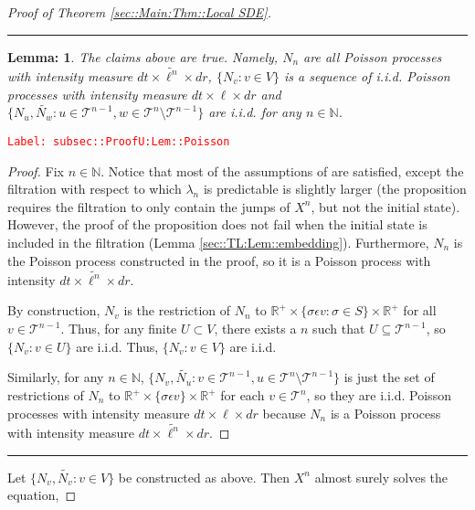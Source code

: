 \documentclass[12pt]{article}
\newcommand{\mb}{\mathbb}
\newcommand{\mc}{\mathcal}
\newcommand{\ep}{\epsilon}
\newcommand{\tr}{\textcolor{red}}
\newcommand{\labe}[1]{\tr{\texttt{Label: #1}}}
\newcommand{\ind}{\hspace{24pt}}
\newcommand{\lin}{\rule{\linewidth}{0.4 pt}}
\renewcommand{\v}{v}							%
\newcommand{\vv}{u}								%
\newcommand{\vvv}{w}							%
\renewcommand{\U}{U}							%
\renewcommand{\S}{S}							%
\newcommand{\s}{\sigma}							%
\newcommand{\ev}{\ep}							%
\renewcommand{\t}{t}							%
\newcommand{\poiss}[1]{N_{#1}}						%
\newcommand{\pup}[1]{^{#1}}							%
\newcommand{\tree}{\mc{T}}							%
\newcommand{\V}{V}									%
\renewcommand{\r}{r}								%
\newcommand{\numb}{n}								%
\newcommand{\rxvtsn}[3]{X_{#1}^{#3}{#2}}			%
\newcommand{\rate}[1]{\lambda_{#1}}					%
\newcommand{\Sm}{\ell}								%
\newcommand{\alt}{\widetilde}						%
\newtheorem{lem}[thms]{Lemma: }
\begin{document}
\begin{proof}[Proof of Theorem \ref{sec::Main:Thm::Local SDE}]
\lin

\begin{lem}
The claims above are true. Namely, \(\poiss{\numb}\) are all Poisson processes with intensity measure \(d\t\times\alt{\Sm^{\numb}}\times d\r\), \(\{\poiss{\v}:\v\in\V\}\) is a sequence of i.i.d. Poisson processes with intensity measure \(d\t\times\Sm\times d\r\) and \(\{\poiss{\vv},\alt{\poiss{\vvv}}:\vv\in \tree\pup{\numb-1},\vvv\in\tree\pup{\numb}\setminus\tree\pup{\numb-1}\}\) are i.i.d. for any \(\numb \in \mb{N}\).

\label{subsec::ProofU:Lem::Poisson}
\end{lem}
\labe{subsec::ProofU:Lem::Poisson}
\begin{proof}

Fix \(\numb \in \mb{N}\). Notice that most of the assumptions of \cite[Proposition 14.7.I(b)]{DalVer08} are satisfied, except the filtration with respect to which \(\rate{\numb}\) is predictable is slightly larger (the proposition requires the filtration to only contain the jumps of \(\rxvtsn{}{}{\numb}\), but not the initial state). However, the proof of the proposition does not fail when the initial state is included in the filtration (Lemma \ref{sec::TL:Lem::embedding}). Furthermore, \(\poiss{\numb}\) is the Poisson process constructed in the proof, so it is a Poisson process with intensity \(d\t\times \alt{\Sm^\numb}\times d\r\).

\ind By construction, \(\poiss{\v}\) is the restriction of \(\poiss{\numb}\) to \(\mb{R}^+ \times \{\s\ev{\v}: \s\in \S\}\times \mb{R}^+\) for all \(\v\in \tree\pup{\numb-1}\). Thus, for any finite \(\U \subset \V\), there exists a \(\numb\) such that \(\U \subseteq \tree\pup{\numb-1}\), so \(\{\poiss{\v}: \v\in \U\}\) are i.i.d. Thus, \(\{\poiss{\v}: \v\in \V\}\) are i.i.d.

\ind Similarly, for any \(\numb \in \mb{N}\), \(\{\poiss{\v},\alt{\poiss{\vv}}: \v \in \tree\pup{\numb-1},\vv\in\tree\pup{\numb}\setminus\tree\pup{\numb-1}\}\) is just the set of restrictions of \(\poiss{\numb}\) to \(\mb{R}^+\times\{\s\ev{\v}\}\times\mb{R}^+\) for each \(\v\in \tree\pup{\numb}\), so they are i.i.d. Poisson processes with intensity measure \(d\t\times \Sm\times d\r\) because \(\poiss{\numb}\) is a Poisson process with intensity measure \(d\t\times\alt{\Sm^\numb}\times d\r\).
\end{proof}
\lin

Let \(\{\poiss{\v},\alt{\poiss{\v}}:\v\in\V\}\) be constructed as above. Then \(\rxvtsn{}{}{\numb}\) almost surely solves the equation,


\end{proof}
\end{document}
